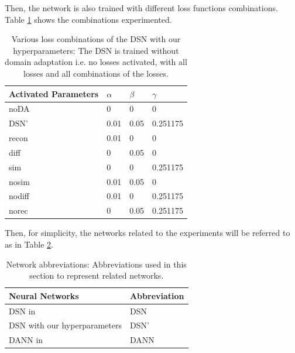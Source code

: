 Then, the network is also trained with different loss functions combinations. Table \ref{tb:lossCombinations} shows the combinations experimented.  
\begin{table}[h!]
\begin{center}
\begin{tabular}{l|lll}
Activated Parameters & $\alpha$ & $\beta$ & $\gamma$ \\ \hline
noDA                 & 0        & 0       & 0        \\
DSN'                 & 0.01     & 0.05    & 0.251175 \\
recon                & 0.01     & 0       & 0        \\
diff                 & 0        & 0.05    & 0        \\
sim                  & 0        & 0       & 0.251175 \\
nosim                & 0.01     & 0.05    & 0        \\
nodiff               & 0.01     & 0       & 0.251175 \\
norec                & 0        & 0.05    & 0.251175
\end{tabular}
\caption{Various loss combinations of the DSN with our hyperparameters: The DSN is trained without domain adaptation i.e. no losses activated, with all losses and all combinations of the losses.}
\label{tb:lossCombinations}
\end{center}
\end{table}

Then, for simplicity, the networks related to the experiments will be referred to as in Table \ref{tb:networkNames}.

\begin{table}[h!]
\begin{center}
\begin{tabular}{l|l}
Neural Networks              & Abbreviation \\ \hline
DSN in \cite{DSN}            & DSN          \\
DSN with our hyperparameters & DSN'         \\
DANN in \cite{domainMixture} & DANN        
\end{tabular}
\caption{Network abbreviations: Abbreviations used in this section to represent related networks.}
\label{tb:networkNames}
\end{center}
\end{table}

